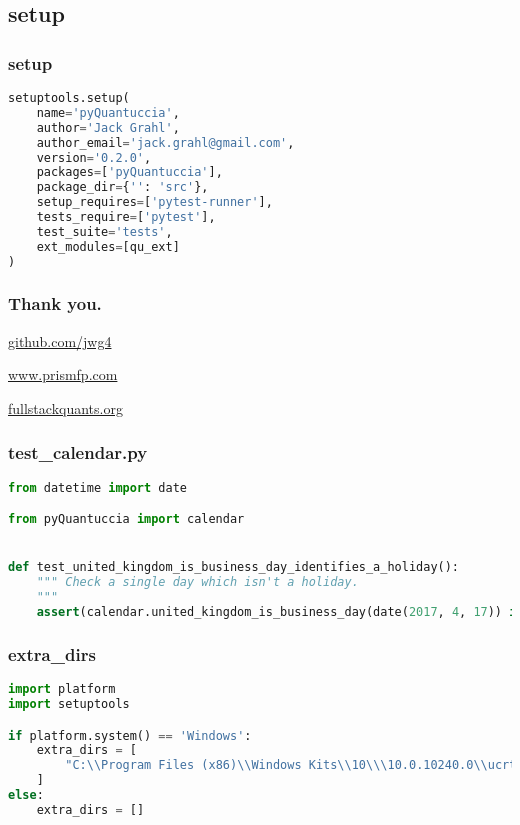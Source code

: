 \documentclass{beamer}
\begin{document}
	\subsection{setup}
	\begin{frame}[fragile]
		\frametitle{setup}
		\begin{lstlisting}[language=Python]
setuptools.setup(
    name='pyQuantuccia',
    author='Jack Grahl',
    author_email='jack.grahl@gmail.com',
    version='0.2.0',
    packages=['pyQuantuccia'],
    package_dir={'': 'src'},
    setup_requires=['pytest-runner'],
    tests_require=['pytest'],
    test_suite='tests',
    ext_modules=[qu_ext]
)
		\end{lstlisting}
	\end{frame}

	\begin{frame}
		\frametitle{Thank you.}
		\url{github.com/jwg4}

		\url{www.prismfp.com}

		\url{fullstackquants.org}
	\end{frame}

	\begin{frame}[fragile]
		\frametitle{test\_calendar.py}
		\begin{lstlisting}[language=Python]
from datetime import date

from pyQuantuccia import calendar


def test_united_kingdom_is_business_day_identifies_a_holiday():
    """ Check a single day which isn't a holiday.
    """
    assert(calendar.united_kingdom_is_business_day(date(2017, 4, 17)) is False)
		\end{lstlisting}
	\end{frame}

	\begin{frame}[fragile]
		\frametitle{extra\_dirs}
		\begin{lstlisting}[language=Python]
import platform
import setuptools

if platform.system() == 'Windows':
    extra_dirs = [
        "C:\\Program Files (x86)\\Windows Kits\\10\\\10.0.10240.0\\ucrt"
    ]
else:
    extra_dirs = []
		\end{lstlisting}
	\end{frame}
\end{document}
